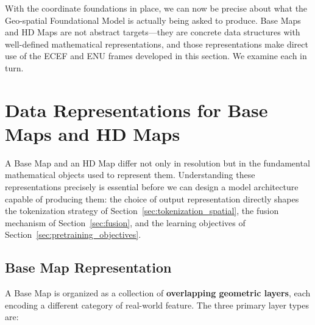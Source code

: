 \documentclass{book}
\begin{document}
With the coordinate foundations in place, we can now be precise about
what the Geo-spatial Foundational Model is actually being asked to
produce.  Base Maps and HD Maps are not abstract targets---they are
concrete data structures with well-defined mathematical representations,
and those representations make direct use of the ECEF and ENU frames
developed in this section.  We examine each in turn.

\section{Data Representations for Base Maps and HD Maps}
\label{sec:representations}

A Base Map and an HD Map differ not only in resolution but in the
fundamental mathematical objects used to represent them.  Understanding
these representations precisely is essential before we can design a
model architecture capable of producing them: the choice of output
representation directly shapes the tokenization strategy of
Section~\ref{sec:tokenization_spatial}, the fusion mechanism of
Section~\ref{sec:fusion}, and the learning objectives of
Section~\ref{sec:pretraining_objectives}.

\subsection{Base Map Representation}

A Base Map is organized as a collection of \textbf{overlapping
geometric layers}, each encoding a different category of real-world
feature.  The three primary layer types are:
\end{document}
